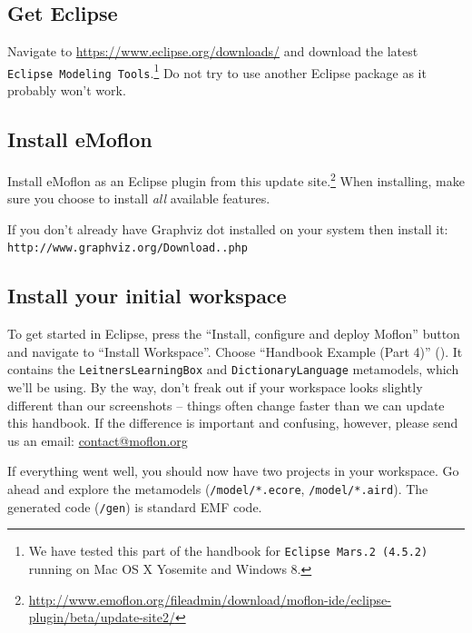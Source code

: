 
\subsection{Get Eclipse}
\label{sec:get-eclipse}

Navigate to \url{https://www.eclipse.org/downloads/} and download the latest \texttt{Eclipse Modeling Tools}.\footnote{We have tested this part of the handbook for \texttt{Eclipse Mars.2 (4.5.2)} running on Mac OS X Yosemite and Windows 8.}
Do not try to use another Eclipse package as it probably won't work.

\subsection{Install eMoflon}
\label{sec:get-emoflon}

Install eMoflon as an Eclipse plugin from this update site.\footnote{\url{http://www.emoflon.org/fileadmin/download/moflon-ide/eclipse-plugin/beta/update-site2/}}
When installing, make sure you choose to install \emph{all} available features.

If you don't already have Graphviz dot installed on your system then install it:  \texttt{http://www.graphviz.org/Download..php}

\subsection{Install your initial workspace}
\label{sec:loadSourceMeta}

To get started in Eclipse, press the ``Install, configure and deploy Moflon'' button and navigate to ``Install Workspace''. 
Choose ``Handbook Example (Part 4)'' (). 
It contains the \texttt{Leitners\-Learning\-Box} and \texttt{Dictionary\-Language} metamodels, which we'll be using. 
By the way, don't freak out if your workspace looks slightly different than our screenshots -- things often change faster than we can update this handbook.
If the difference is important and confusing, however, please send us an email:  \url{contact@moflon.org}

If everything went well, you should now have two projects in your workspace.  
Go ahead and explore the metamodels (\texttt{/model/*.ecore}, \texttt{/model/*.aird}).
The generated code (\texttt{/gen}) is standard EMF code.


